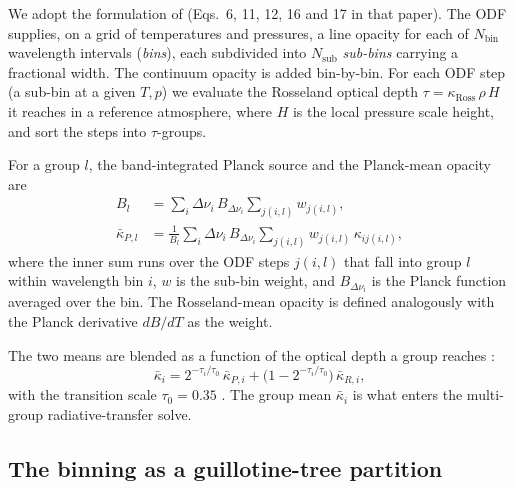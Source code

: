 \documentclass{aa}
\begin{document}
   We adopt the formulation of \citet{vogler2004} (Eqs.~6, 11, 12, 16
   and 17 in that paper). The ODF supplies, on a
   grid of temperatures and pressures, a line opacity for each of
   $N_\mathrm{bin}$ wavelength intervals (\emph{bins}), each subdivided
   into $N_\mathrm{sub}$ \emph{sub-bins} carrying a fractional width. The
   continuum opacity is added bin-by-bin. For each ODF step (a sub-bin at
   a given $T,p$) we evaluate the Rosseland optical depth
   $\tau=\kappa_\mathrm{Ross}\,\rho\,H$ it reaches in a reference
   atmosphere, where $H$ is the local pressure scale height, and sort the
   steps into $\tau$-groups.

   For a group $l$, the band-integrated Planck source and the Planck-mean
   opacity are \citep[Eqs.~16 and 17]{vogler2004}
   \begin{align}
      B_l      &= \sum_i \Delta\nu_i\, B_{\Delta\nu_i}
                  \sum_{j(i,l)} w_{j(i,l)}, \label{eq:Bl}\\
      \bar\kappa_{P,l}
               &= \frac{1}{B_l}\sum_i \Delta\nu_i\, B_{\Delta\nu_i}
                  \sum_{j(i,l)} w_{j(i,l)}\,\kappa_{ij(i,l)},
                  \label{eq:kappap}
   \end{align}
   where the inner sum runs over the ODF steps $j(i,l)$ that fall into
   group $l$ within wavelength bin $i$, $w$ is the sub-bin weight, and
   $B_{\Delta\nu_i}$ is the Planck function averaged over the bin. The
   Rosseland-mean opacity is defined analogously with the Planck
   derivative $dB/dT$ as the weight.

   The two means are blended as a function of the optical depth a group
   reaches \citep[Eq.~12]{vogler2004}:
   \begin{equation}
      \bar\kappa_i = 2^{-\tau_i/\tau_0}\,\bar\kappa_{P,i}
                   + \bigl(1 - 2^{-\tau_i/\tau_0}\bigr)\,\bar\kappa_{R,i},
      \label{eq:blend}
   \end{equation}
   with the transition scale $\tau_0 = 0.35$ \citep{ludwig1992,vogler2004}.
   The group mean $\bar\kappa_i$ is what enters the multi-group
   radiative-transfer solve.

\subsection{The binning as a guillotine-tree partition}
\label{sec:tree}
\end{document}
